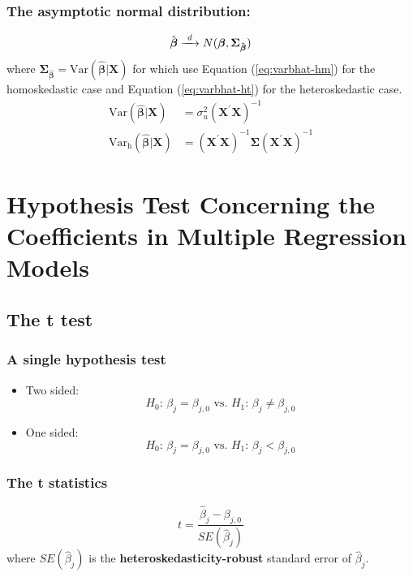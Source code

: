 \documentclass[a4paper,10pt]{article}
\newcommand{\var}{\mathrm{Var}}
\newcommand{\rarrowd}[1]{\xrightarrow{\text{ \textit #1 }}}
\begin{document}
\subsubsection*{The asymptotic normal distribution:}
\label{sec:org6cf3692}
\begin{equation}
\label{eq:normal-bhat-m}
\hat{\boldsymbol{\beta}} \rarrowd{d} N(\boldsymbol{\beta}, \mathbf{\Sigma_{\hat{\boldsymbol{\beta}}}})
\end{equation}
where \(\mathbf{\Sigma_{\hat{\boldsymbol{\beta}}}} =
\var(\hat{\boldsymbol{\beta}} | \mathbf{X})\) for which use
Equation (\ref{eq:varbhat-hm}) for the homoskedastic case and Equation
(\ref{eq:varbhat-ht}) for the heteroskedastic case. 
\begin{align}
\var(\hat{\boldsymbol{\beta}} | \mathbf{X}) &= \sigma^2_u (\mathbf{X}^{\prime} \mathbf{X})^{-1} \label{eq:varbhat-hm} \\
\var_{\mathrm{h}}(\hat{\boldsymbol{\beta}} | \mathbf{X}) &= \left(\mathbf{X}^{\prime} \mathbf{X}\right)^{-1} \mathbf{\Sigma} (\mathbf{X}^{\prime} \mathbf{X})^{-1} \label{eq:varbhat-ht}
\end{align} 

\section{Hypothesis Test Concerning the Coefficients in Multiple Regression Models}
\label{sec:orgcda6518}
\subsection{The t test}
\label{sec:org2c0e38c}
\subsubsection*{A single hypothesis test}
\label{sec:orgd918425}
\begin{itemize}
\item Two sided: \[ H_0:\, \beta_j = \beta_{j,0} \text{ vs. } H_1:\, \beta_j \neq
  \beta_{j,0} \]
\item One sided: \[ H_0:\, \beta_j = \beta_{j,0} \text{ vs. } H_1:\, \beta_j <
  \beta_{j,0} \]
\end{itemize}
\subsubsection*{The t statistics}
\label{sec:org1be51f3}
\[ t = \frac{\hat{\beta}_j - \beta_{j,0}}{SE(\hat{\beta}_j)} \]
where \(SE(\hat{\beta}_j)\) is the \textbf{heteroskedasticity-robust} standard error of \(\hat{\beta}_j\). 
\end{document}
